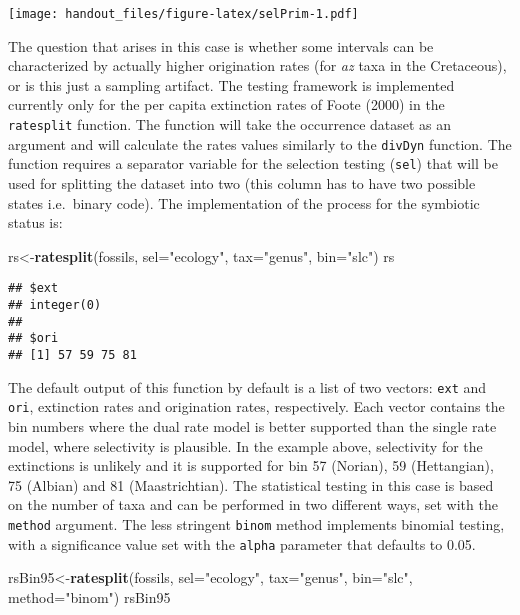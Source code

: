 \documentclass[]{article}
\newenvironment{Shaded}{\begin{snugshade}}{\end{snugshade}}
\newcommand{\KeywordTok}[1]{\textcolor[rgb]{0.13,0.29,0.53}{\textbf{{#1}}}}
\newcommand{\DataTypeTok}[1]{\textcolor[rgb]{0.13,0.29,0.53}{{#1}}}
\newcommand{\StringTok}[1]{\textcolor[rgb]{0.31,0.60,0.02}{{#1}}}
\newcommand{\NormalTok}[1]{{#1}}
\begin{document}
\texttt{[image: handout\_files/figure-latex/selPrim-1.pdf]}

The question that arises in this case is whether some intervals can be
characterized by actually higher origination rates (for \emph{az} taxa
in the Cretaceous), or is this just a sampling artifact. The testing
framework is implemented currently only for the per capita extinction
rates of Foote (2000) in the \texttt{ratesplit} function. The function
will take the occurrence dataset as an argument and will calculate the
rates values similarly to the \texttt{divDyn} function. The function
requires a separator variable for the selection testing (\texttt{sel})
that will be used for splitting the dataset into two (this column has to
have two possible states i.e.~binary code). The implementation of the
process for the symbiotic status is:

\begin{Shaded}
\begin{Highlighting}[]
\NormalTok{rs<-}\KeywordTok{ratesplit}\NormalTok{(fossils, }\DataTypeTok{sel=}\StringTok{"ecology"}\NormalTok{, }\DataTypeTok{tax=}\StringTok{"genus"}\NormalTok{, }\DataTypeTok{bin=}\StringTok{"slc"}\NormalTok{)}
\NormalTok{rs}
\end{Highlighting}
\end{Shaded}

\begin{verbatim}
## $ext
## integer(0)
## 
## $ori
## [1] 57 59 75 81
\end{verbatim}

The default output of this function by default is a list of two vectors:
\texttt{ext} and \texttt{ori}, extinction rates and origination rates,
respectively. Each vector contains the bin numbers where the dual rate
model is better supported than the single rate model, where selectivity
is plausible. In the example above, selectivity for the extinctions is
unlikely and it is supported for bin 57 (Norian), 59 (Hettangian), 75
(Albian) and 81 (Maastrichtian). The statistical testing in this case is
based on the number of taxa and can be performed in two different ways,
set with the \texttt{method} argument. The less stringent \texttt{binom}
method implements binomial testing, with a significance value set with
the \texttt{alpha} parameter that defaults to 0.05.

\begin{Shaded}
\begin{Highlighting}[]
\NormalTok{rsBin95<-}\KeywordTok{ratesplit}\NormalTok{(fossils, }\DataTypeTok{sel=}\StringTok{"ecology"}\NormalTok{, }\DataTypeTok{tax=}\StringTok{"genus"}\NormalTok{, }
  \DataTypeTok{bin=}\StringTok{"slc"}\NormalTok{, }\DataTypeTok{method=}\StringTok{"binom"}\NormalTok{)}
\NormalTok{rsBin95}
\end{Highlighting}
\end{Shaded}
\end{document}

